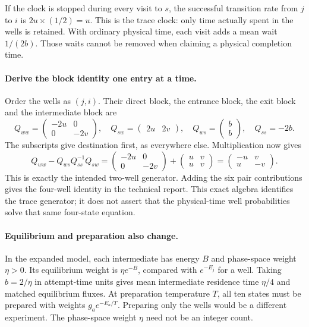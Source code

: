 \documentclass[11pt]{article}
\begin{document}
If the clock is stopped during every visit to $s$, the successful transition
rate from $j$ to $i$ is $2u\times(1/2)=u$. This is the trace clock:
only time actually spent in the wells is retained. With ordinary physical
time, each visit adds a mean wait $1/(2b)$. Those waits cannot be removed
when claiming a physical completion time.

\paragraph{Derive the block identity one entry at a time.}
Order the wells as $(j,i)$. Their direct block, the entrance block, the
exit block and the intermediate block are
\[
 Q_{ww}=\begin{pmatrix}-2u&0\\0&-2v\end{pmatrix},\quad
 Q_{sw}=\begin{pmatrix}2u&2v\end{pmatrix},\quad
 Q_{ws}=\begin{pmatrix}b\\b\end{pmatrix},\quad Q_{ss}=-2b.
\]
The subscripts give destination first, as everywhere else. Multiplication
now gives
\[
 Q_{ww}-Q_{ws}Q_{ss}^{-1}Q_{sw}
 =\begin{pmatrix}-2u&0\\0&-2v\end{pmatrix}
  +\begin{pmatrix}u&v\\u&v\end{pmatrix}
 =\begin{pmatrix}-u&v\\u&-v\end{pmatrix}.
\]
This is exactly the intended two-well generator. Adding the six pair
contributions gives the four-well identity in the technical report.
This exact algebra identifies the trace generator; it does not assert that
the physical-time well probabilities solve that same four-state equation.

\paragraph{Equilibrium and preparation also change.}
In the expanded model, each intermediate has energy $B$ and phase-space
weight $\eta>0$. Its equilibrium weight is $\eta e^{-B}$, compared
with $e^{-E_j}$ for a well. Taking $b=2/\eta$ in attempt-time units
gives mean intermediate residence time $\eta/4$ and matched equilibrium
fluxes. At preparation temperature $T$, all ten states must be prepared
with weights $g_a e^{-E_a/T}$. Preparing only the wells would be a different
experiment. The phase-space weight $\eta$ need not be an integer count.
\end{document}
